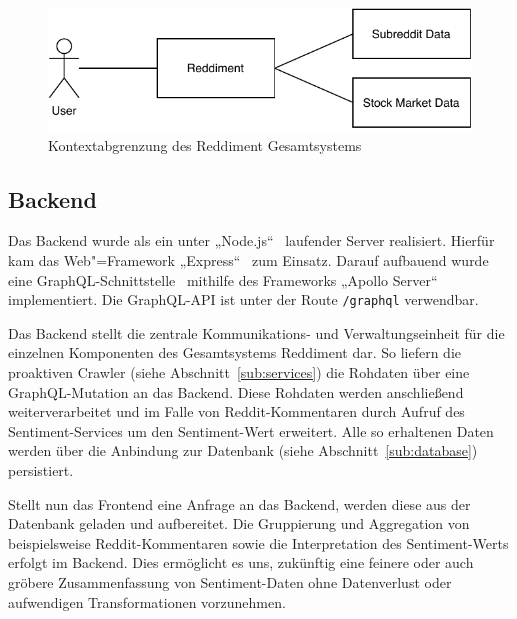 \documentclass[a4paper, 10pt, conference]{IEEEtran}
\begin{document}
\begin{figure}[ht]
	\centering
	\includegraphics[width=\linewidth]{context}
	\caption{Kontextabgrenzung des Reddiment Gesamtsystems}
	\label{fig:context}
\end{figure}

\subsection{Backend} \label{sub:backend}
Das Backend wurde als ein unter „Node.js“~\cite{node} laufender Server realisiert. Hierfür kam das Web"=Framework „Express“~\cite{express} zum Einsatz. Darauf aufbauend wurde eine GraphQL-Schnittstelle~\cite{graphql} mithilfe des Frameworks „Apollo Server“~\cite{apolloserver} implementiert. Die GraphQL-API ist unter der Route \texttt{/graphql} verwendbar.

Das Backend stellt die zentrale Kommunikations- und Verwaltungseinheit für die einzelnen Komponenten des Gesamtsystems Reddiment dar. So liefern die proaktiven Crawler (siehe Abschnitt~\ref{sub:services}) die Rohdaten über eine GraphQL-Mutation an das Backend. Diese Rohdaten werden anschließend weiterverarbeitet und im Falle von Reddit-Kommentaren durch Aufruf des Sentiment-Services um den Sentiment-Wert erweitert. Alle so erhaltenen Daten werden über die Anbindung zur Datenbank (siehe Abschnitt~\ref{sub:database}) persistiert.

Stellt nun das Frontend eine Anfrage an das Backend, werden diese aus der Datenbank geladen und aufbereitet. Die Gruppierung und Aggregation von beispielsweise Reddit-Kommentaren sowie die Interpretation des Sentiment-Werts erfolgt im Backend. Dies ermöglicht es uns, zukünftig eine feinere oder auch gröbere Zusammenfassung von Sentiment-Daten ohne Datenverlust oder aufwendigen Transformationen vorzunehmen.


\end{document}
